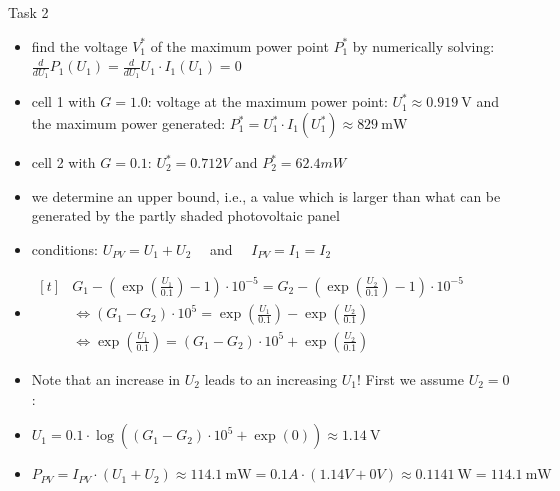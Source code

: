 \begin{frame}[allowframebreaks]{Task 2}{}
\begin{requirementsnoinc}
  \end{requirementsnoinc}
  \begin{solutionnoinc}
    \begin{itemize}
      \item find the \alert{voltage} $V_1^*$ of the \alert{maximum power point} $P_1^*$ by numerically solving: $\displaystyle\frac{d}{d U_1} P_1\left(U_1\right)=\frac{d}{d U_1} U_1 \cdot I_1\left(U_1\right)=0$
      \item cell 1 with $G=1.0$: voltage at the maximum power point: $U_1^* \approx 0.919 \mathrm{~V}$ and the maximum power generated: $P_1^*=U_1^* \cdot I_1\left(U_1^*\right) \approx 829 \mathrm{~mW}$
      \item cell 2 with $G=0.1$: $U_2^*=0.712V$ and $P_2^*=62.4mW$
      \item  we determine an upper bound, i.e., a value which is larger than what can be generated by the partly shaded photovoltaic panel
      \item conditions: $U_{P V}=U_1+U_2 \quad$ and $\quad I_{P V}=I_1=I_2$
    \end{itemize}
  \end{solutionnoinc}
  \begin{solutionnoinc}
    \begin{itemize}
      \item $\begin{aligned}[t]
            & G_1-\left(\exp \left(\frac{U_1}{0.1}\right)-1\right) \cdot 10^{-5}=G_2-\left(\exp \left(\frac{U_2}{0.1}\right)-1\right) \cdot 10^{-5} \\
            & \Leftrightarrow\left(G_1-G_2\right) \cdot 10^5=\exp \left(\frac{U_1}{0.1}\right)-\exp \left(\frac{U_2}{0.1}\right) \\
            & \Leftrightarrow \exp \left(\frac{U_1}{0.1}\right)=\left(G_1-G_2\right) \cdot 10^5+\exp \left(\frac{U_2}{0.1}\right)
      \end{aligned}$
      \item Note that an increase in $U_2$ leads to an increasing $U_1$! First we assume $U_2 = 0$:
      \item $U_1=0.1 \cdot \log \left(\left(G_1-G_2\right) \cdot 10^5+\exp (0)\right) \approx 1.14 \mathrm{~V}$
      \item $P_{P V}=I_{P V} \cdot\left(U_1+U_2\right) \approx 114.1 \mathrm{~mW} = 0.1A \cdot\left(1.14V+0V\right) \approx 0.1141 \mathrm{~W} = 114.1 \mathrm{~mW}$
    \end{itemize}
  \end{solutionnoinc}

\end{frame}
